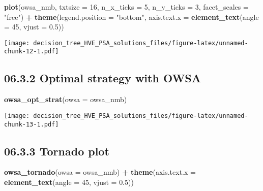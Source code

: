 \documentclass[
]{article}
\newenvironment{Shaded}{\begin{snugshade}}{\end{snugshade}}
\newcommand{\DataTypeTok}[1]{\textcolor[rgb]{0.13,0.29,0.53}{#1}}
\newcommand{\DecValTok}[1]{\textcolor[rgb]{0.00,0.00,0.81}{#1}}
\newcommand{\FloatTok}[1]{\textcolor[rgb]{0.00,0.00,0.81}{#1}}
\newcommand{\KeywordTok}[1]{\textcolor[rgb]{0.13,0.29,0.53}{\textbf{#1}}}
\newcommand{\NormalTok}[1]{#1}
\newcommand{\OperatorTok}[1]{\textcolor[rgb]{0.81,0.36,0.00}{\textbf{#1}}}
\newcommand{\StringTok}[1]{\textcolor[rgb]{0.31,0.60,0.02}{#1}}
\begin{document}
\begin{Shaded}
\begin{Highlighting}[]
\KeywordTok{plot}\NormalTok{(owsa_nmb, }\DataTypeTok{txtsize =} \DecValTok{16}\NormalTok{, }\DataTypeTok{n_x_ticks =} \DecValTok{5}\NormalTok{, }\DataTypeTok{n_y_ticks =} \DecValTok{3}\NormalTok{,}
     \DataTypeTok{facet_scales =} \StringTok{"free"}\NormalTok{) }\OperatorTok{+}
\StringTok{     }\KeywordTok{theme}\NormalTok{(}\DataTypeTok{legend.position =} \StringTok{"bottom"}\NormalTok{, }
           \DataTypeTok{axis.text.x =} \KeywordTok{element_text}\NormalTok{(}\DataTypeTok{angle =} \DecValTok{45}\NormalTok{, }\DataTypeTok{vjust =} \FloatTok{0.5}\NormalTok{))}
\end{Highlighting}
\end{Shaded}

\texttt{[image: decision\_tree\_HVE\_PSA\_solutions\_files/figure-latex/unnamed-chunk-12-1.pdf]}

\hypertarget{optimal-strategy-with-owsa}{%
\subsection{06.3.2 Optimal strategy with
OWSA}\label{optimal-strategy-with-owsa}}

\begin{Shaded}
\begin{Highlighting}[]
\KeywordTok{owsa_opt_strat}\NormalTok{(}\DataTypeTok{owsa =}\NormalTok{ owsa_nmb)}
\end{Highlighting}
\end{Shaded}

\texttt{[image: decision\_tree\_HVE\_PSA\_solutions\_files/figure-latex/unnamed-chunk-13-1.pdf]}

\hypertarget{tornado-plot}{%
\subsection{06.3.3 Tornado plot}\label{tornado-plot}}

\begin{Shaded}
\begin{Highlighting}[]
\KeywordTok{owsa_tornado}\NormalTok{(}\DataTypeTok{owsa =}\NormalTok{ owsa_nmb) }\OperatorTok{+}
\StringTok{  }\KeywordTok{theme}\NormalTok{(}\DataTypeTok{axis.text.x =} \KeywordTok{element_text}\NormalTok{(}\DataTypeTok{angle =} \DecValTok{45}\NormalTok{, }\DataTypeTok{vjust =} \FloatTok{0.5}\NormalTok{))}
\end{Highlighting}
\end{Shaded}
\end{document}
